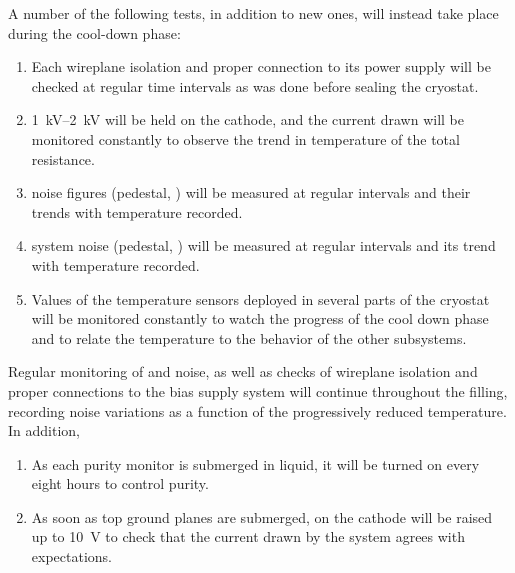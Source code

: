 A number of %
the following tests, in addition to new ones, will instead take place during the cool-down phase:

\begin{enumerate}


    \item Each  wireplane isolation and proper connection to its  power supply will be checked at regular time intervals as was done before sealing the cryostat.
    
    \item \SIrange{1}{2}{kV} will be held on the cathode, and the current drawn will be  monitored constantly to observe the trend in temperature of the total resistance.
    
    \item {} noise figures (pedestal, ) will be measured at regular intervals and their trends with temperature recorded.
    
    \item {} system noise (pedestal, ) will be measured at regular intervals and its trend with temperature recorded.
    
     \item Values of the temperature sensors deployed in several parts of the cryostat will be monitored constantly to %
     watch the progress of the cool down phase and to relate the temperature to the behavior of the other  subsystems. 
     
\end{enumerate}

Regular monitoring of  and  noise, as well as checks of wireplane isolation and proper connections to the bias supply system will continue throughout the filling, recording noise variations as a function of the progressively reduced temperature. In addition,

\begin{enumerate}

    \item As each purity monitor is submerged in liquid, it will be turned on every eight hours to control  purity.
    
    \item As soon as top ground planes are submerged,  on the cathode will be raised up to \SI{10}{V} to check that the current drawn by the system agrees with expectations.

\end{enumerate}


